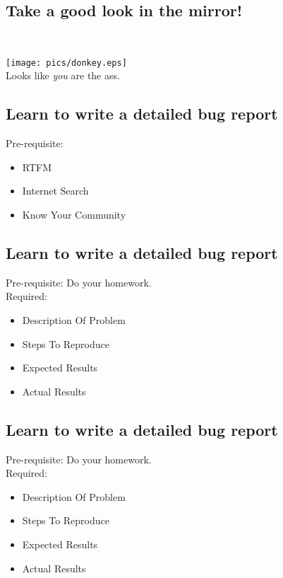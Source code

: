 \documentclass[xga]{xdvislides}
\begin{document}
\subsection{Take a good look in the mirror!}
\\
\vspace*{\fill}
\begin{center}
	\texttt{[image: pics/donkey.eps]} \\
	\small
	Looks like {\em you} are the ass.
\end{center}
\vspace*{\fill}

\subsection{Learn to write a detailed bug report}
Pre-requisite:
\begin{itemize}
	\item RTFM
	\item Internet Search
	\item Know Your Community
\end{itemize}

\subsection{Learn to write a detailed bug report}
Pre-requisite: Do your homework. \\

Required:
\begin{itemize}
	\item Description Of Problem
	\item Steps To Reproduce
	\item Expected Results
	\item Actual Results
\end{itemize}

\subsection{Learn to write a detailed bug report}
Pre-requisite: Do your homework. \\

Required:
\begin{itemize}
	\item Description Of Problem
	\item Steps To Reproduce
	\item Expected Results
	\item Actual Results
\end{itemize}
\vspace{.125in}
\end{document}
